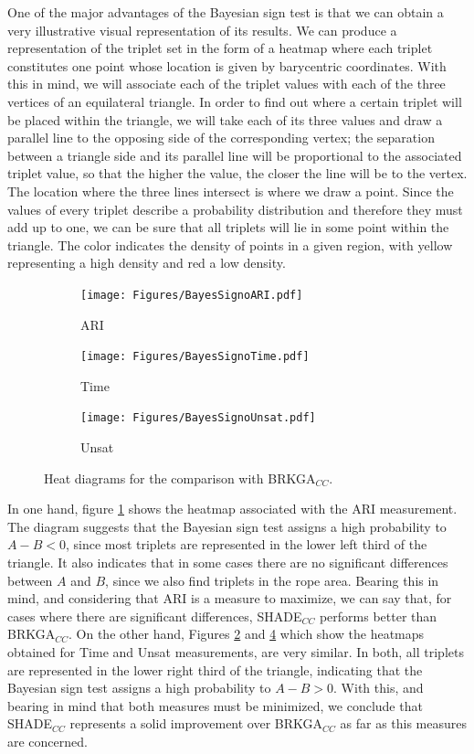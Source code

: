 \documentclass[review]{elsarticle}
\begin{document}
One of the major advantages of the Bayesian sign test is that we can obtain a very illustrative visual representation of its results. We can produce a representation of the triplet set in the form of a heatmap where each triplet constitutes one point whose location is given by barycentric coordinates. With this in mind, we will associate each of the triplet values with each of the three vertices of an equilateral triangle. In order to find out where a certain triplet will be placed within the triangle, we will take each of its three values and draw a parallel line to the opposing side of the corresponding vertex; the separation between a triangle side and its parallel line will be proportional to the associated triplet value, so that the higher the value, the closer the line will be to the vertex. The location where the three lines intersect is where we draw a point. Since the values of every triplet describe a probability distribution and therefore they must add up to one, we can be sure that all triplets will lie in some point within the triangle. The color indicates the density of points in a given region, with yellow representing a high density and red a low density.

\begin{figure}[ht!]
	\centering
	\begin{subfigure}{.45\textwidth}
		\texttt{[image: Figures/BayesSignoARI.pdf]}
		\caption{ARI}
		\label{fig:bayesARI}
	\end{subfigure}
	\begin{subfigure}{.45\textwidth}
		\texttt{[image: Figures/BayesSignoTime.pdf]}
		\caption{Time}
		\label{fig:bayesTime}
	\end{subfigure}
	\begin{subfigure}{.45\textwidth}
		\texttt{[image: Figures/BayesSignoUnsat.pdf]}
		\caption{Unsat}
		\label{fig:bayesUnsat}
	\end{subfigure}
	\caption{Heat diagrams for the comparison with BRKGA$_{CC}$.}
\end{figure}

In one hand, figure \ref{fig:bayesARI} shows the heatmap associated with the ARI measurement. The diagram suggests that the Bayesian sign test assigns a high probability to $A - B < 0$, since most triplets are represented in the lower left third of the triangle. It also indicates that in some cases there are no significant differences between $A$ and $B$, since we also find triplets in the rope area. Bearing this in mind, and considering that ARI is a measure to maximize, we can say that, for cases where there are significant differences, SHADE$_{CC}$ performs better than BRKGA$_{CC}$. On the other hand, Figures \ref{fig:bayesTime} and \ref{fig:bayesUnsat} which show the heatmaps obtained for Time and Unsat measurements, are very similar. In both, all triplets are represented in the lower right third of the triangle, indicating that the Bayesian sign test assigns a high probability to $A - B > 0$. With this, and bearing in mind that both measures must be minimized, we conclude that SHADE$_{CC}$ represents a solid improvement over BRKGA$_{CC}$ as far as this measures are concerned.
\end{document}
